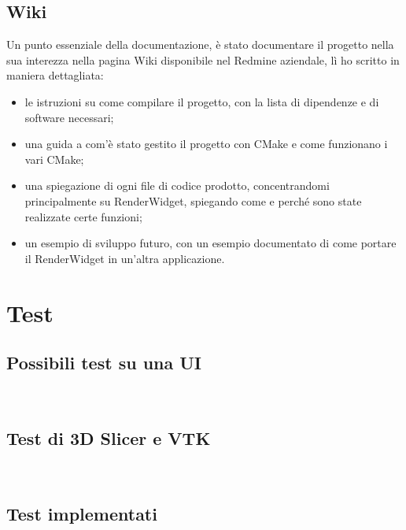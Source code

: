 \subsection{Wiki}
Un punto essenziale della documentazione, è stato documentare il progetto nella sua interezza nella pagina Wiki disponibile nel Redmine aziendale, lì ho scritto in maniera dettagliata:
\begin{itemize}
\item le istruzioni su come compilare il progetto, con la lista di dipendenze e di software necessari;
\item una guida a com'è stato gestito il progetto con CMake e come funzionano i vari CMake;
\item una spiegazione di ogni file di codice prodotto, concentrandomi principalmente su RenderWidget, spiegando come e perché sono state realizzate certe funzioni;
\item un esempio di sviluppo futuro, con un esempio documentato di come portare il RenderWidget in un'altra applicazione.
\end{itemize}

\section{Test}
\subsection{Possibili test su una UI}
\\

\subsection{Test di 3D Slicer e VTK}
\\

\subsection{Test implementati}
\\